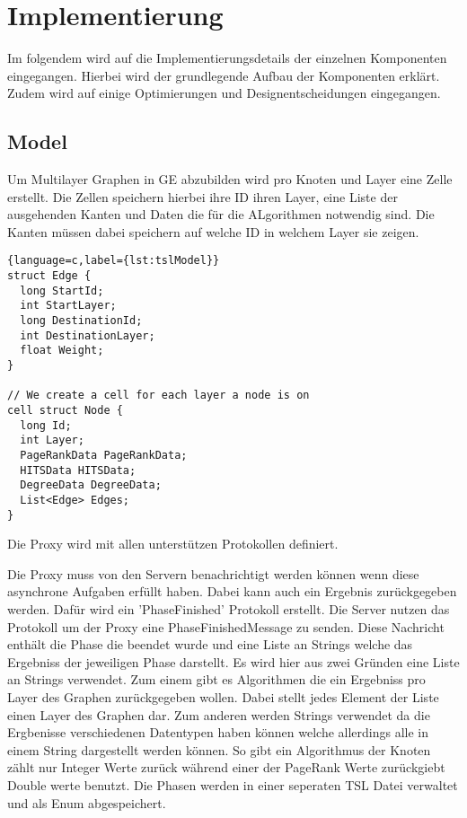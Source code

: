 \section{Implementierung}

Im folgendem wird auf die Implementierungsdetails der einzelnen Komponenten eingegangen. Hierbei wird der grundlegende Aufbau der Komponenten erklärt.
Zudem wird auf einige Optimierungen und Designentscheidungen eingegangen.


\subsection{Model}



Um Multilayer Graphen in GE abzubilden wird pro Knoten und Layer eine Zelle erstellt. Die Zellen speichern hierbei ihre ID ihren Layer, eine Liste der ausgehenden Kanten und Daten die für die ALgorithmen notwendig sind.
Die Kanten müssen dabei speichern auf welche ID in welchem Layer sie zeigen.

\begin{lstlisting}{language=c,label={lst:tslModel}}
struct Edge {
  long StartId;
  int StartLayer;
  long DestinationId;
  int DestinationLayer;
  float Weight;
}

// We create a cell for each layer a node is on
cell struct Node {
  long Id;
  int Layer;
  PageRankData PageRankData;
  HITSData HITSData;
  DegreeData DegreeData;
  List<Edge> Edges;
}
\end{lstlisting}

Die Proxy wird mit allen unterstützen Protokollen definiert. 

Die Proxy muss von den Servern benachrichtigt werden können wenn diese asynchrone Aufgaben erfüllt haben. Dabei kann auch ein Ergebnis zurückgegeben werden.
Dafür wird ein 'PhaseFinished' Protokoll erstellt. Die Server nutzen das Protokoll um der Proxy eine PhaseFinishedMessage zu senden. Diese Nachricht enthält
die Phase die beendet wurde und eine Liste an Strings welche das Ergebniss der jeweiligen Phase darstellt. Es wird hier aus zwei Gründen eine Liste an Strings verwendet. Zum einem gibt es Algorithmen die ein Ergebniss pro Layer des Graphen zurückgegeben wollen. Dabei stellt jedes Element der Liste einen Layer des Graphen dar. Zum anderen werden Strings verwendet da die Ergbenisse verschiedenen Datentypen haben können welche allerdings alle in einem String dargestellt werden können. So gibt ein Algorithmus der Knoten zählt nur Integer Werte zurück während einer der PageRank Werte zurückgiebt Double werte benutzt.
Die Phasen werden in einer seperaten TSL Datei verwaltet und als Enum abgespeichert.


